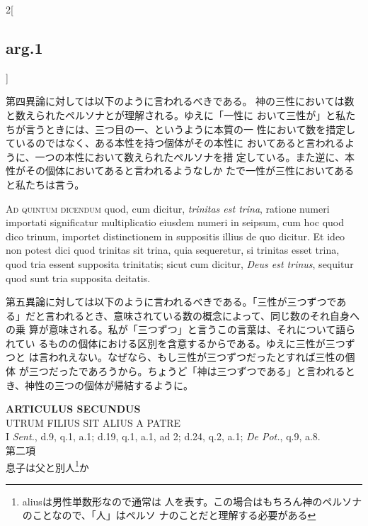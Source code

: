\documentclass[paper=a4paper,fontsize=10pt,jafontsize=9pt,titlepage]{jlreq}
\begin{document}
\begin{paracol}{2}[\subsection{arg.1}]
\switchcolumn

第四異論に対しては以下のように言われるべきである。
神の三性においては数と数えられたペルソナとが理解される。ゆえに「一性に
 おいて三性が」と私たちが言うときには、三つ目の一、というように本質の一
 性において数を措定しているのではなく、ある本性を持つ個体がその本性に
 おいてあると言われるように、一つの本性において数えられたペルソナを措
 定している。また逆に、本性がその個体においてあると言われるようなしか
 たで一性が三性においてあると私たちは言う。

\switchcolumn*[\subsection{ad.5}]

{\scshape Ad quintum dicendum} quod, cum dicitur, {\itshape trinitas est trina}, ratione
numeri importati significatur multiplicatio eiusdem numeri in seipsum,
cum hoc quod dico trinum, importet distinctionem in suppositis illius
de quo dicitur. Et ideo non potest dici quod trinitas sit trina, quia
sequeretur, si trinitas esset trina, quod tria essent supposita
trinitatis; sicut cum dicitur, {\itshape Deus est trinus}, sequitur quod sunt
tria supposita deitatis.

\switchcolumn

第五異論に対しては以下のように言われるべきである。「三性が三つずつであ
 る」だと言われるとき、意味されている数の概念によって、同じ数のそれ自身への乗
 算が意味される。私が「三つずつ」と言うこの言葉は、それについて語られてい
 るものの個体における区別を含意するからである。ゆえに三性が三つずつと
 は言われえない。なぜなら、もし三性が三つずつだったとすれば三性の個体
 が三つだったであろうから。ちょうど「神は三つずつである」と言われると
 き、神性の三つの個体が帰結するように。

\end{paracol}
\newpage


\begin{center}
{\Large {\bfseries ARTICULUS SECUNDUS}}\\
{\large UTRUM FILIUS SIT ALIUS A PATRE}\\
{\footnotesize I {\itshape Sent.}, d.9, q.1, a.1; d.19, q.1, a.1, ad
 2; d.24, q.2, a.1; {\itshape De Pot.}, q.9, a.8.}\\
{\Large 第二項\\息子は父と別人\footnote{aliusは男性単数形なので通常は
 人を表す。この場合はもちろん神のペルソナのことなので、「人」はペルソ
 ナのことだと理解する必要がある}か}
\end{center}
\end{document}
